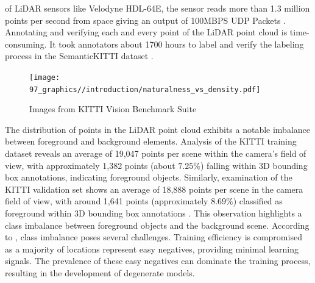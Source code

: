 of LiDAR sensors like Velodyne HDL-64E, the sensor reads more than 1.3 million points per second from space giving an output of 100MBPS UDP Packets \parencite{velodyne_64}. Annotating and verifying each and every point of the LiDAR point cloud is time-consuming. It took annotators about 1700 hours to label and verify the labeling process in the SemanticKITTI dataset \parencite{behley2019semantickitti}.

\begin{figure}[htbp]
    \centering
    \texttt{[image: 97\_graphics//introduction/naturalness\_vs\_density.pdf]}
    \caption{Images from KITTI Vision Benchmark Suite \parencite{Geiger2012CVPR}}
    \label{fig:introduction_surf_variation_in_kitti}
\end{figure}
The distribution of points in the LiDAR point cloud exhibits a notable imbalance between foreground and background elements. Analysis of the KITTI training dataset reveals an average of 19,047 points per scene within the camera's field of view, with approximately 1,382 points (about \(7.25\%\)) falling within 3D bounding box annotations, indicating foreground objects. Similarly, examination of the KITTI validation set shows an average of 18,888 points per scene in the camera field of view, with around 1,641 points (approximately \(8.69\%\)) classified as foreground within 3D bounding box annotations \parencite{DBLP:journals/corr/abs-2004-01643}. This observation highlights a class imbalance between foreground objects and the background scene. According to \parencite{DBLP:journals/corr/abs-1708-02002}, class imbalance poses several challenges. Training efficiency is compromised as a majority of locations represent easy negatives, providing minimal learning signals. The prevalence of these easy negatives can dominate the training process, resulting in the development of degenerate models.
